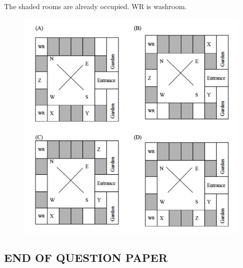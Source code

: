 \documentclass[journal,12pt,onecolumn]{IEEEtran}
\theoremstyle{remark}
\begin{document}
\begin{enumerate}
The shaded rooms are already occupied. WR is washroom.

 \hfill{}
\begin{figure}[H]
    \centering
    \includegraphics[width=0.9\columnwidth]{Fig/10i.png}
    \caption{}
    \label{fig:10i}
\end{figure}
\end{enumerate}
\begin{center}
    \subsection*{END OF QUESTION PAPER}
\end{center}
\newpage
\end{document}
